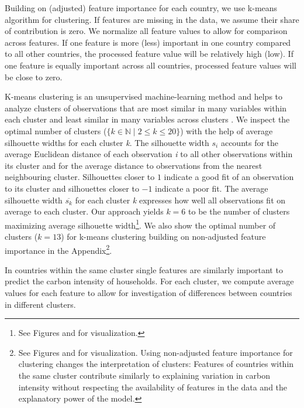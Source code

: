 \documentclass[12pt, a4paper]{article}
\begin{document}
Building on (adjusted) feature importance for each country, we use k-means algorithm for clustering. If features are missing in the data, we assume their share of contribution is zero. We normalize all feature values to allow for comparison across features. If one feature is more (less) important in one country compared to all other countries, the processed feature value will be relatively high (low). If one feature is equally important across all countries, processed feature values will be close to zero.

K-means clustering is an unsupervised machine-learning method and helps to analyze clusters of observations that are most similar in many variables within each cluster and least similar in many variables across clusters \autocite{MacQueen.1967}. We inspect the optimal number of clusters ($\{k \in \mathbb{N} \mid 2  \leq k \leq 20 \}$) with the help of average silhouette widths \autocite{Rousseeuw.1987} for each cluster \textit{k}. The silhouette width $s_{i}$ accounts for the average Euclidean distance of each observation \textit{i} to all other observations within its cluster and for the average distance to observations from the nearest neighbouring cluster. Silhouettes closer to $1$ indicate a good fit of an observation to its cluster and silhouettes closer to $-1$ indicate a poor fit. The average silhouette width $\overline{s_{k}}$ for each cluster \textit{k} expresses how well all observations fit on average to each cluster. Our approach yields $k = 6$ to be the number of clusters maximizing average silhouette width\footnote{See Figures and  for visualization.}. We also show the optimal number of clusters ($k = 13$) for k-means clustering building on non-adjusted feature importance in the Appendix\footnote{See Figures  and  for visualization. Using non-adjusted feature importance for clustering changes the interpretation of clusters: Features of countries within the same cluster contribute similarly to explaining variation in carbon intensity without respecting the availability of features in the data and the explanatory power of the model.}.

In countries within the same cluster single features are similarly important to predict the carbon intensity of households. For each cluster, we compute average values for each feature to allow for investigation of differences between countries in different clusters.%
\end{document}
